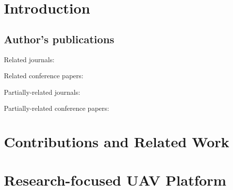 \documentclass[a4paper,11pt,titlepage,twoside]{book}
\newcommand{\chapternoclear}[1]{
  \begingroup
  \let\cleardoublepage\clearpage
  \chapter{#1}
  \endgroup
}
\newcommand{\conditionalClearPage}{
  \ifdefined\printversion
  \clearemptydoublepage
  \else
  \newpage{}
  \clearpage
  \fi
}
\begin{document}


\conditionalClearPage


\conditionalClearPage


\conditionalClearPage


\pagestyle{fancy}

\conditionalClearPage
\tableofcontents



\chapternoclear{Introduction}


\section{Author's publications}

Related journals:
\cite{baca2018rospix}
\cite{baca2019autonomous}
\cite{spurny2019cooperative}
\cite{saska2017system}
\cite{giernacky2019realtime}
\cite{chudoba2016exploration}
\cite{saska2020formation}
\cite{loianno2018localization}
\cite{petrlik2020robust}
\cite{stibinger2020localization}
\cite{saikin2020wildfire}
\cite{baca2020mrs}

Related conference papers:
\cite{baca2019timepix}
\cite{baca2018model}
\cite{baca2016embedded}
\cite{baca2017autonomous}
\cite{saska2017documentation}
\cite{spurny2016complex}
\cite{faigl2017onsolution}
\cite{saska2016formations}
\cite{roucek2019darpa}

Partially-related journals:
\cite{baca2016miniaturized}
\cite{baca2018timepix}
\cite{daniel2019inorbit}
\cite{urban2017vzlusat}

Partially-related conference papers:
\cite{daniel2016terrestrial}
\cite{daniel2017xray}





\chapternoclear{Contributions and Related Work}




\chapternoclear{Research-focused UAV Platform}
\end{document}
